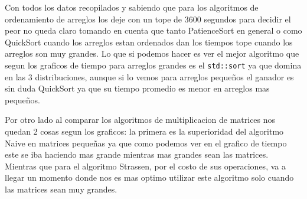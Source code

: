 Con todos los datos recopilados y sabiendo que para los algoritmos de ordenamiento de arreglos los deje con un tope de 3600 segundos para decidir el peor no queda claro tomando en cuenta que tanto PatienceSort en general o como QuickSort cuando los arreglos estan ordenados dan los tiempos tope cuando los arreglos son muy grandes. Lo que si podemos hacer es ver el mejor algoritmo que segun los graficos de tiempo para arreglos grandes es el \texttt{std::sort} ya que domina en las 3 distribuciones, aunque si lo vemos para arreglos pequeños el ganador es sin duda QuickSort ya que su tiempo promedio es menor en arreglos mas pequeños. 

Por otro lado al comparar los algoritmos de multiplicacion de matrices nos quedan 2 cosas segun los graficos: la primera es la superioridad del algoritmo Naive en matrices pequeñas ya que como podemos ver en el grafico de tiempo este se iba haciendo mas grande mientras mas grandes sean las matrices. Mientras que para el algoritmo Strassen, por el costo de sus operaciones, va a llegar un momento donde nos es mas optimo utilizar este algoritmo solo cuando las matrices sean muy grandes.